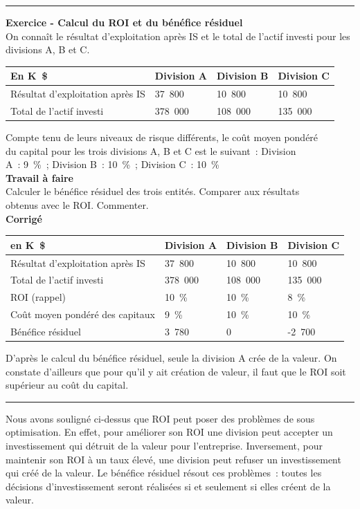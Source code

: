 \documentclass{tufte-handout}
\begin{document}
\begin{enumerate}
\noindent\rule{\textwidth}{0.5pt}
\textbf{Exercice -  Calcul du ROI et du bénéfice résiduel}\\
On connaît le résultat d'exploitation après IS et le total de l'actif investi pour les divisions A, B et C.\\
\begin{center}
\begin{tabular}{llll}
En K \$ & Division A & Division B & Division C\\
\hline
Résultat d'exploitation après IS & 37 800 & 10 800 & 10 800\\
Total de l'actif investi & 378 000 & 108 000 & 135 000\\
\end{tabular}
\end{center}
Compte tenu de leurs niveaux de risque différents, le coût moyen pondéré\\
du capital pour les trois divisions A, B et C est le suivant : Division\\
A : 9 \% ; Division B : 10 \% ; Division C : 10 \%\\
\textbf{Travail à faire}\\
Calculer le bénéfice résiduel des trois entités. Comparer aux résultats\\
obtenus avec le ROI. Commenter.\\
\textbf{Corrigé}\\
\begin{center}
\begin{tabular}{llll}
en K \$ & Division A & Division B & Division C\\
\hline
Résultat d'exploitation après IS & 37 800 & 10 800 & 10 800\\
Total de l'actif investi & 378 000 & 108 000 & 135 000\\
ROI (rappel) & 10 \% & 10 \% & 8 \%\\
Coût moyen pondéré des capitaux & 9 \% & 10 \% & 10 \%\\
Bénéfice résiduel & 3 780 & 0 & -2 700\\
\end{tabular}
\end{center}
D'après le calcul du bénéfice résiduel, seule la division A crée de la valeur. On constate d'ailleurs que pour qu'il y ait création de valeur, il faut que le ROI soit supérieur au coût du capital.\\

\noindent\rule{\textwidth}{0.5pt}

Nous avons souligné ci-dessus que ROI peut poser des problèmes de sous optimisation. En effet, pour améliorer son ROI une division peut accepter un investissement qui détruit de la valeur pour l'entreprise. Inversement, pour maintenir son ROI à un taux élevé, une division peut refuser un investissement qui créé de la valeur. Le bénéfice résiduel résout ces problèmes : toutes les décisions d'investissement seront réalisées si et seulement si elles créent de la valeur.\\


\end{enumerate}
\end{document}
